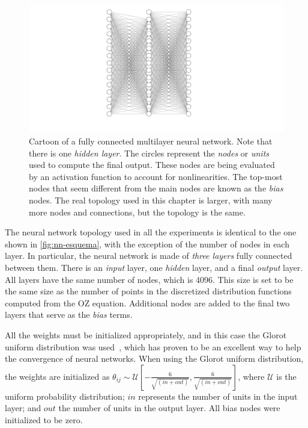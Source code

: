 \begin{figure}[t]
    \includegraphics[width=\textwidth]{figuras/capitulo-4/neural-network.pdf}
    \vspace{-1.5cm}
    \caption[General schematics of a neural network.]{Cartoon of a fully connected multilayer neural network. Note that there is one \emph{hidden layer}. The circles represent the \emph{nodes} or \emph{units} used to compute the final output. These nodes are being evaluated by an activation function to account for nonlinearities. The top-most nodes that seem different from the main nodes are known as the \emph{bias} nodes. The real topology used in this chapter is larger, with many more nodes and connections, but the topology is the same.}
    \label{fig:nn-esquema}
\end{figure}

The neural network topology used in all the experiments is identical to the one
shown in \autoref{fig:nn-esquema}, with the exception of the number of nodes in each layer.
In particular, the neural network is made of \emph{three layers} fully connected between 
them.
There is an \emph{input} layer, one \emph{hidden} layer, and a final \emph{output} layer.
All layers have the same number of nodes, which is 4096. This size is set to be the same 
size as the number of points in the discretized distribution functions computed from the OZ 
equation. Additional nodes are added to the final two layers that serve as the \emph{bias} 
terms.

All the weights must be initialized appropriately, and in this case the Glorot uniform
distribution was used~\cite{glorotUnderstandingDifficultyTraining2010}, which has proven
to be an excellent way to help the convergence of neural networks.
When using the Glorot uniform distribution, the weights are initialized as
$
\theta_{ij} \sim \mathcal{U} \left[ -\frac{6}{\sqrt{(in + out)}},
\frac{6}{\sqrt{(in + out)}} \right]
$,
where $\mathcal{U}$ is the uniform probability distribution;
$in$ represents the number of units in the input layer; and $out$ the number of
units in the output layer. All bias nodes were initialized to be zero.

